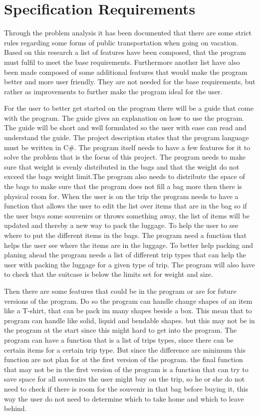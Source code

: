 \section{Specification Requirements}
\label{sec:Spec}
Through the problem analysis it has been documented that there are some strict rules regarding some forms of public transportation when going on vacation. Based on this research a list of features have been composed, that the program must fulfil to meet the base requirements.
Furthermore another list have also been made composed of some additional features that would make the program better and more user friendly. They are not needed for the base requirements, but rather as improvements to further make the program ideal for the user.

For the user to better get started on the program there will be a guide that come with the program. The guide gives an explanation on how to use the program. The guide will be short and well formulated so the user with ease can read and understand the guide.
The project description states that the program language must be written in C#.
The program itself needs to have a few features  for it to solve the problem that is  the focus of this project. The program needs to make sure that weight is evenly distributed in the bags and that the weight do not exceed the bags weight limit.The program also needs to distribute the space of the bags to make sure that the program does not fill a bag more then there is physical room for.
When the user is on the trip the program needs to have a function that allows the user to edit the list over items that are in the bag so if the user buys some souvenirs or throws something away, the list of items will be updated and thereby a new way to pack the luggage.
To help the user to see where to put the different items in the bags. The program need a function that helps the user see where the items are in the luggage. To better help packing and planing ahead the program needs a list of different trip types that can help the user with packing the luggage for a given type of trip.
The program will also have to check that the suitcase is below the limits set for weight and size.


Then there are some features that could be in the program or are for future versions of the program. Do so the program can handle change shapes of an item like a T-shirt, that can be pack im many shapes beside a box. This mean that to program can handle like solid, liquid and bendable shapes. but this may not be in the program at the start since this might hard to get into the program.
The program can have a function that is a list of trips types, since there can be certain items for a certain trip type. But since the difference are minimum this function are not plan for at the first version of the program.
the final function that may not be in the first version of the program is a function that can try to save space for all souvenirs the user might buy on the trip, so he or she do not need to check if there is room for the souvenir in that bag before buying it, this way the user do not need to determine which to take home and which to leave behind.

